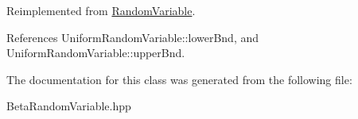 Reimplemented from \hyperlink{classPecos_1_1RandomVariable_af6b5fc528523180bed5fc3008dcea205}{Random\+Variable}.



References Uniform\+Random\+Variable\+::lower\+Bnd, and Uniform\+Random\+Variable\+::upper\+Bnd.



The documentation for this class was generated from the following file\+:\begin{DoxyCompactItemize}
\item 
Beta\+Random\+Variable.\+hpp\end{DoxyCompactItemize}
